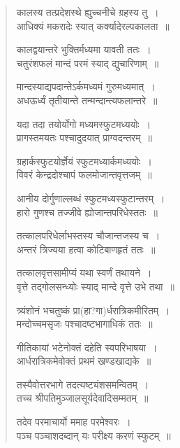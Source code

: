 \documentclass[11pt, openany]{book}
\begin{document}
\begin{quote}
{\qt कालस्य तत्प्रदेशस्थे ह्युच्चनीचे ग्रहस्य तु~।\\
आधिक्यं मकरादेः स्यात् कर्क्यादेरल्पकालता~॥

कालद्वयान्तरे भुक्तिर्मध्यमा यावती ततः~।\\
चतुरंशफलं मान्दं परमं स्याद् द्युचारिणाम्~॥

मान्दस्याद्यपदान्तेऽर्कमध्यमं गुरुमध्यमात्~।\\
अधऊर्ध्वं तृतीयान्ते तन्मन्दान्त्यफलान्तरे~॥

यदा तदा तयोर्योगो मध्यमस्फुटमध्ययोः~।\\
प्रागस्तमयतः पश्चादुदयात् प्राग्वदन्तरम्~॥

ग्रहार्कस्फुटयोर्ज्ञेयं स्फुटमध्यार्कमध्ययोः~।\\
विवरं केन्द्रदोश्चापं फलमोजान्तवृत्तजम्~॥

आनीय दोर्गुणाल्लब्धं स्फुटमध्यस्फुटान्तरम्~।\\
हारो गुणश्च तज्जीवे ह्योजान्तपरिधेस्ततः~॥

तत्कालपरिधेर्लाभस्तस्य चौजान्तजस्य च~।\\
अन्तरं त्रिज्यया हत्वा कोटिबाणहृतं ततः~॥

तत्कालवृत्तसामीप्यं यथा स्वर्णं तथायने~।\\
वृत्ते तद्गोलसन्ध्योः स्याद् मान्दे वृत्ते उभे तथा~॥

त्र्यंशोनं भचतुष्कं प्रा(हा?गा)र्धरात्रिकमीरितम्~।\\
मन्दोच्चमसृजः पश्चादष्टभागाधिकं ततः~॥

गीतिकायां भटेनोक्तं दहेति स्वपरिभाषया~।\\
आर्धरात्रिकमेवोक्तं प्रथमं खण्डखाद्यके~॥

तस्यैवोत्तरभागे तदत्यष्ट्यंशसमन्वितम्~।\\
तच्च श्रीपतिमुञ्जालसूर्यदेवादिसम्मतम्~॥

तदेव परमाचार्यो ममाह परमेश्वरः~।\\
पञ्च पञ्चाशदब्दान् यः परीक्ष्य करणं स्फुटम्~॥}
\end{quote}
\end{document}
